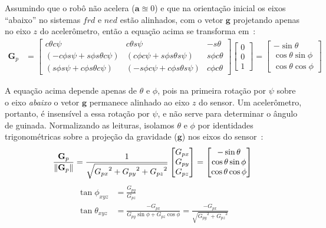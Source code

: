 Assumindo que o robô não acelera (\(\mathbf{a}\approxeq0\)) e que na orientação inicial os eixos ``abaixo'' no sistemas \(frd\) e \(ned\) estão alinhados, com o vetor \(\mathbf{g}\) projetando apenas no eixo \(z\) do acelerômetro, então a equação acima se transforma em~\cite{freescaleAN3461}:
\begin{align*}
    {\mathbf{G}}_p &= \begin{bmatrix}
        c\theta c\psi   & c\theta s\psi & -s\theta    \\
        \left(-c\phi s\psi + s\phi s\theta c\psi \right)
        &  \left( c\phi c\psi + s\phi s\theta s\psi \right)
        &  s\phi c\theta                                 \\
        \left( s\phi s\psi + c\phi s\theta c\psi \right)
        &  \left( -s\phi c\psi + c\phi s\theta s\psi \right)
        & c\phi c\theta
    \end{bmatrix} \begin{bmatrix} 0 \\ 0 \\ 1 \end{bmatrix} = \begin{bmatrix} -\sin{\theta} \\ \cos{\theta}\sin{\phi} \\ \cos{\theta}\cos{\phi} \end{bmatrix}
\end{align*}

A equação acima depende apenas de \(\theta\) e \(\phi\), pois na primeira rotação por \(\psi\) sobre o eixo \emph{abaixo} o vetor \(\mathbf{g}\) permanece alinhado ao eixo \(z\) do sensor. Um acelerômetro, portanto, é insensível a essa rotação por \(\psi\), e não serve para determinar o ângulo de guinada\footnotemark{}. Normalizando as leituras, isolamos \(\theta\) e \(\phi\) por identidades trigonométricas sobre a projeção da gravidade (\(\mathbf{g}\)) nos eixos do sensor~\cite{freescaleAN3461}:
\begin{equation*}
    \frac{{\mathbf{G}}_{p}}{\lVert{{\mathbf{G}}_{p}}\rVert} =
    \frac{1}{\sqrt{{{{G}_{px}}^{2}} + {{{G}_{py}}^{2}} + {{G}_{pz}}^{2}}} \begin{bmatrix} {G}_{px} \\ {G}_{py} \\ {G}_{pz} \end{bmatrix}
    = \begin{bmatrix} -\sin{\theta} \\ \cos{\theta}\sin{\phi} \\ \cos{\theta}\cos{\phi} \end{bmatrix} \\
\end{equation*}
\begin{align*}
    \tan{\phi}_{xyz} &= \frac{G_{py}}{G_{pz}} \\
    \tan{\theta}_{xyz} &= \frac{-G_{px}}{{G_{py}\sin{\phi}}+{{{G}_{pz}}\cos{\phi}}} = \frac{-G_{px}}{\sqrt{{{G_{py}}^{2}}+{{{G}_{pz}}^2}}}
\end{align*}

